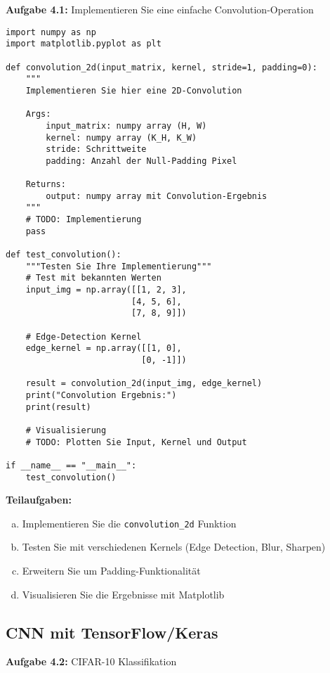 \documentclass[12pt,a4paper]{article}
\begin{document}
\textbf{Aufgabe 4.1:} Implementieren Sie eine einfache Convolution-Operation

\begin{lstlisting}[caption=Grundgerüst für Convolution]
import numpy as np
import matplotlib.pyplot as plt

def convolution_2d(input_matrix, kernel, stride=1, padding=0):
    """
    Implementieren Sie hier eine 2D-Convolution
    
    Args:
        input_matrix: numpy array (H, W)
        kernel: numpy array (K_H, K_W)
        stride: Schrittweite
        padding: Anzahl der Null-Padding Pixel
    
    Returns:
        output: numpy array mit Convolution-Ergebnis
    """
    # TODO: Implementierung
    pass

def test_convolution():
    """Testen Sie Ihre Implementierung"""
    # Test mit bekannten Werten
    input_img = np.array([[1, 2, 3], 
                         [4, 5, 6], 
                         [7, 8, 9]])
    
    # Edge-Detection Kernel
    edge_kernel = np.array([[1, 0], 
                           [0, -1]])
    
    result = convolution_2d(input_img, edge_kernel)
    print("Convolution Ergebnis:")
    print(result)
    
    # Visualisierung
    # TODO: Plotten Sie Input, Kernel und Output

if __name__ == "__main__":
    test_convolution()
\end{lstlisting}

\textbf{Teilaufgaben:}
\begin{enumerate}[(a)]
    \item Implementieren Sie die \texttt{convolution\_2d} Funktion
    \item Testen Sie mit verschiedenen Kernels (Edge Detection, Blur, Sharpen)
    \item Erweitern Sie um Padding-Funktionalität
    \item Visualisieren Sie die Ergebnisse mit Matplotlib
\end{enumerate}

\subsection{CNN mit TensorFlow/Keras}

\textbf{Aufgabe 4.2:} CIFAR-10 Klassifikation
\end{document}
